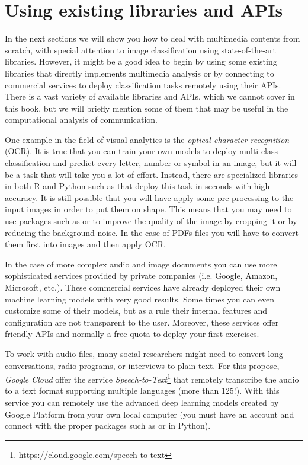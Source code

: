\section{Using existing libraries and APIs}
\label{sec:apivisions}

In the next sections we will show you how to deal with multimedia contents from scratch, with special attention to image classification using state-of-the-art libraries. However, it might be a good idea to begin by using some existing libraries that directly implements multimedia analysis or by connecting to commercial services to deploy classification tasks remotely using their APIs. There is a vast variety of available libraries and APIs, which we cannot cover in this book, but we will briefly mention some of them that may be useful in the computational analysis of communication.

One example in the field of visual analytics is the \textit{optical character recognition} (OCR). It is true that you can train your own models to deploy multi-class classification and predict every letter, number or symbol in an image, but it will be a task that will take you a lot of effort. Instead, there are specialized libraries in both R and Python such as  that deploy this task in seconds with high accuracy. It is still possible that you will have apply some pre-processing to the input images in order to put them on shape. This means that you may need to use packages such as  or  to improve the quality of the image by cropping it or by reducing the background noise.  In the case of PDFs files you will have to convert them first into images and then apply OCR.

In the case of more complex audio and image documents you can use more sophisticated services provided by private companies (i.e. Google, Amazon, Microsoft, etc.). These commercial services have already deployed their own machine learning models with very good results. Some times you can even customize some of their models, but as a rule their internal features and configuration are not transparent to the user. Moreover, these services offer friendly APIs and normally a free quota to deploy your first exercises.

To work with audio files, many social researchers might need to convert long conversations, radio programs, or interviews to plain text. For this propose, \textit{Google Cloud} offer the service \textit{Speech-to-Text}\footnote{https://cloud.google.com/speech-to-text}  that remotely transcribe the audio to a text format supporting multiple languages (more than 125!). With this service you can remotely use the advanced deep learning models created by Google Platform from your own local computer (you must have an account and connect with the proper packages such as  or  in Python).

